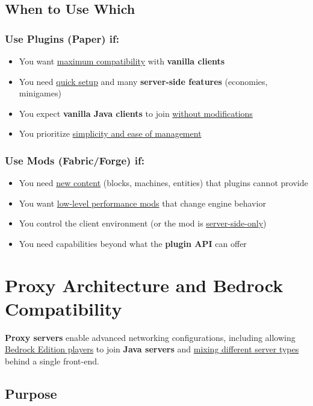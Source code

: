 \documentclass{article}
\begin{document}
\subsection{When to Use Which}

\subsubsection{Use Plugins (Paper) if:}

\begin{itemize}
    \item You want \uline{maximum compatibility} with \textbf{vanilla clients}
    \item You need \uline{quick setup} and many \textbf{server-side features} (economies, minigames)
    \item You expect \textbf{vanilla Java clients} to join \uline{without modifications}
    \item You prioritize \uline{simplicity and ease of management}
\end{itemize}

\subsubsection{Use Mods (Fabric/Forge) if:}

\begin{itemize}
    \item You need \uline{new content} (blocks, machines, entities) that plugins cannot provide
    \item You want \uline{low-level performance mods} that change engine behavior
    \item You control the client environment (or the mod is \uline{server-side-only})
    \item You need capabilities beyond what the \textbf{plugin API} can offer
\end{itemize}

\newpage
\section{Proxy Architecture and Bedrock Compatibility}

\textbf{Proxy servers} enable advanced networking configurations, including allowing \uline{Bedrock Edition players} to join \textbf{Java servers} and \uline{mixing different server types} behind a single front-end.

\subsection{Purpose}
\end{document}
